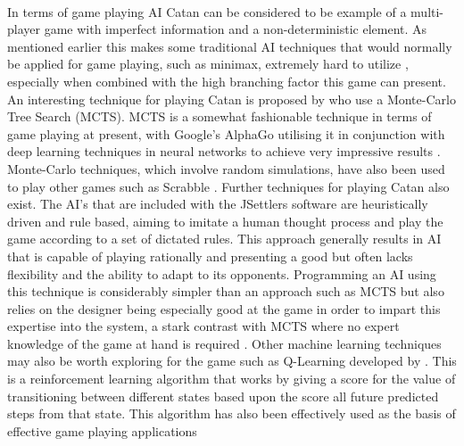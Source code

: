 \documentclass[]{article}
\begin{document}
\paragraph{}
In terms of game playing AI Catan can be considered to be example of a multi-player game with imperfect information and a non-deterministic element. As mentioned earlier this makes some traditional AI techniques that would normally be applied for game playing, such as minimax, extremely hard to utilize \autocite{pfeiffer2004reinforcement}, especially when combined with the high branching factor this game can present. An interesting technique for playing Catan is proposed by \textcite{szita2009monte} who use a Monte-Carlo Tree Search (MCTS). MCTS is a somewhat fashionable technique in terms of game playing at present, with Google's AlphaGo utilising it in conjunction with deep learning techniques in neural networks to achieve very impressive results \autocite{silver2016mastering}. Monte-Carlo techniques, which involve random simulations, have also been used to play other games such as Scrabble \autocite{sheppard2002world}. Further techniques for playing Catan also exist. The AI's that are included with the JSettlers software are heuristically driven and rule based, aiming to imitate a human thought process and play the game according to a set of dictated rules. This approach generally results in AI that is capable of playing rationally and presenting a good but often lacks flexibility and the ability to adapt to its opponents. Programming an AI using this technique is considerably simpler than an approach such as MCTS but also relies on the designer being especially good at the game in order to impart this expertise into the system, a stark contrast with MCTS where no expert knowledge of the game at hand is required \autocite{chaslot2008monte}. Other machine learning techniques may also be worth exploring for the game such as Q-Learning developed by \textcite{watkins1992q}. This is a reinforcement learning algorithm that works by giving a score for the value of transitioning between different states based upon the score all future predicted steps from that state. This algorithm has also been effectively used as the basis of effective game playing applications \autocite{mnih2015human}     
\end{document}
